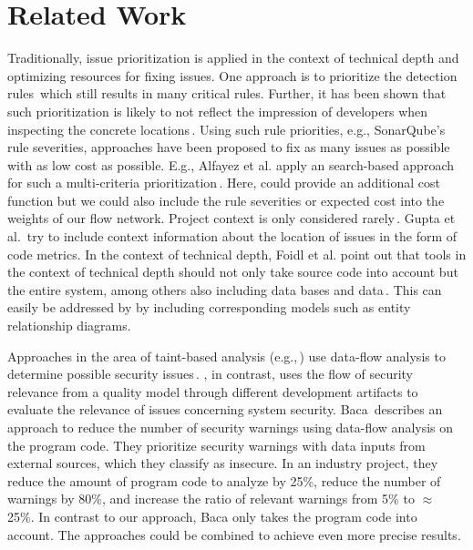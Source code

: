 \section{Related Work}
\label{sec:rw}

Traditionally, issue prioritization is applied in the context of technical depth and optimizing resources for fixing issues.
One approach is to prioritize the detection rules\,\cite{FV15} which still results in many critical rules. Further, it has been shown that such prioritization is likely to not reflect the impression of developers when inspecting the concrete locations\,\cite{Katin2022}.
Using such rule priorities, e.g., SonarQube's rule severities, approaches have been proposed to fix as many issues as possible with as low cost as possible. E.g., Alfayez et al. apply an search-based approach for such a multi-criteria prioritization\,\cite{AB19}. Here, \appr{} could provide an additional cost function but we could also include the rule severities or expected cost into the weights of our flow network. Project context is only considered rarely\,\cite{Pina21}. Gupta et al.\,\cite{Gupta2022} try to include context information about the location of issues in the form of code metrics.
In the context of technical depth, Foidl et al. point out that tools in the context of technical depth should not only take source code into account but the entire system, among others also including data bases and data\,\cite{8906747}. This can easily be addressed by \appr{} by including corresponding models such as entity relationship diagrams.


Approaches in the area of taint-based analysis (e.g.,\,\cite{Huang2014, Tripp2013}) use data-flow analysis to determine possible security issues\,\cite{Thome2018}.
\appr{}, in contrast, uses the flow of security relevance from a quality model through %
different development artifacts
to evaluate the relevance of issues concerning system security.
Baca\,\cite{Baca2010} describes an approach to reduce the number of security warnings using data-flow analysis on the program code. They prioritize security warnings with data inputs from external sources, which they classify as insecure. In an industry project, they reduce the amount of program code to analyze by 25\%, reduce the number of warnings by 80\%, and increase the ratio of relevant warnings from 5\% to $\approx$~%
25\%. In contrast to  our approach, Baca only takes the program code into account.
The approaches could be combined to achieve even more precise results.

